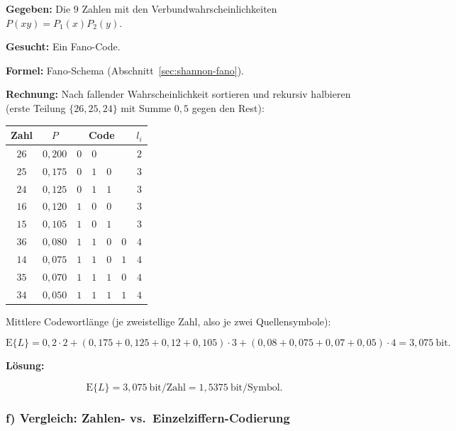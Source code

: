 \begin{beispiel}

\textbf{Gegeben:} Die $9$ Zahlen mit den Verbundwahrscheinlichkeiten
$P(xy) = P_1(x)P_2(y)$.

\textbf{Gesucht:} Ein Fano-Code.

\textbf{Formel:} Fano-Schema (Abschnitt~\ref{sec:shannon-fano}).

\textbf{Rechnung:} Nach fallender Wahrscheinlichkeit sortieren und rekursiv
halbieren (erste Teilung $\{26,25,24\}$ mit Summe $0{,}5$ gegen den Rest):

\begin{center}
\begin{tabular}{c|c|cccc|c}
Zahl & $P$ & \multicolumn{4}{c|}{Code} & $l_i$ \\
\hline
$26$ & $0{,}200$ & $0$ & $0$ &   &   & $2$ \\
$25$ & $0{,}175$ & $0$ & $1$ & $0$ &   & $3$ \\
$24$ & $0{,}125$ & $0$ & $1$ & $1$ &   & $3$ \\
$16$ & $0{,}120$ & $1$ & $0$ & $0$ &   & $3$ \\
$15$ & $0{,}105$ & $1$ & $0$ & $1$ &   & $3$ \\
$36$ & $0{,}080$ & $1$ & $1$ & $0$ & $0$ & $4$ \\
$14$ & $0{,}075$ & $1$ & $1$ & $0$ & $1$ & $4$ \\
$35$ & $0{,}070$ & $1$ & $1$ & $1$ & $0$ & $4$ \\
$34$ & $0{,}050$ & $1$ & $1$ & $1$ & $1$ & $4$ \\
\end{tabular}
\end{center}

Mittlere Codewortlänge (je zweistellige Zahl, also je zwei Quellensymbole):

$$
\mathrm{E}\{L\} = 0{,}2\cdot 2 + (0{,}175 + 0{,}125 + 0{,}12 + 0{,}105)\cdot 3
+ (0{,}08 + 0{,}075 + 0{,}07 + 0{,}05)\cdot 4 = 3{,}075\ \text{bit}.
$$

\textbf{Lösung:}

$$
\boxed{\;\mathrm{E}\{L\} = 3{,}075\ \text{bit/Zahl} = 1{,}5375\ \text{bit/Symbol}.\;}
$$

\end{beispiel}

\subsubsection*{f) Vergleich: Zahlen- vs.\ Einzelziffern-Codierung}

